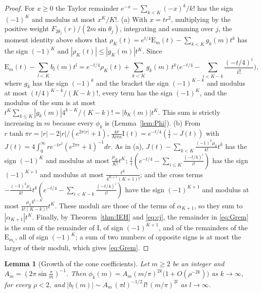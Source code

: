\documentclass[pdflatex,sn-mathphys-num]{sn-jnl}
\theoremstyle{thmstyleone}%
\newtheorem{lemma}[theorem]{Lemma}%
\theoremstyle{thmstylethree}%
\newcommand{\Area}{\operatorname{Area}}
\begin{document}
\begin{appendices}
\begin{proof}
For $x\ge0$ the Taylor remainder $e^{-x}-\sum_{k<K}(-x)^k/k!$ has the sign $(-1)^K$ and modulus at most $x^K/K!$. (a) With $x=tr^2$, multiplying by the positive weight $F_{2\theta_j}(r)/(2m\sin\theta_j)$, integrating and summing over $j$, the moment identity above shows that $\rho_K(t)=e^{t/4}\mathrm E_m(t)-\sum_{k<K}g_k(m)t^k$ has the sign $(-1)^K$ and $|\rho_K(t)|\le|g_K(m)|t^K$. Since
\[
  \mathrm E_m(t)-\sum_{l<K}b_l(m)t^l=e^{-t/4}\rho_K(t)+\sum_{k<K}g_k(m)\,t^k\Big(e^{-t/4}-\sum_{i<K-k}\frac{(-t/4)^i}{i!}\Big),
\]
where $g_k$ has the sign $(-1)^k$ and the bracket the sign $(-1)^{K-k}$ and modulus at most $(t/4)^{K-k}/(K-k)!$, every term has the sign $(-1)^K$, and the modulus of the sum is at most $t^K\sum_{k\le K}|g_k(m)|4^{k-K}/(K-k)!=|b_K(m)|t^K$. This sum is strictly increasing in $m$ because every $\phi_k$ is (Lemma~\ref{lem:Phi}). (b) From $r\tanh\pi r=|r|-2|r|/(e^{2\pi|r|}+1)$, $\frac{4\pi}{\Area}\mathrm I(t)=e^{-t/4}(\frac1t-J(t))$ with $J(t)=4\int_0^\infty re^{-tr^2}(e^{2\pi r}+1)^{-1}dr$. As in (a), $J(t)-\sum_{k<K}\frac{(-1)^k\mu_k}{k!}t^k$ has the sign $(-1)^K$ and modulus at most $\frac{\mu_K}{K!}t^K$; $\frac1t(e^{-t/4}-\sum_{i\le K}\frac{(-t/4)^i}{i!})$ has the sign $(-1)^{K+1}$ and modulus at most $\frac{t^K}{4^{K+1}(K+1)!}$; and the cross terms $-\frac{(-1)^k\mu_k}{k!}t^k(e^{-t/4}-\sum_{i<K-k}\frac{(-t/4)^i}{i!})$ have the sign $(-1)^{K+1}$ and modulus at most $\frac{\mu_k4^{k-K}}{k!(K-k)!}t^K$. These moduli are those of the terms of $\alpha_{K+1}$, so they sum to $|\alpha_{K+1}|t^K$. Finally, by Theorem~\ref{thm:IEH} and \eqref{eq:cj}, the remainder in \eqref{eq:Grem} is the sum of the remainder of $\mathrm I$, of sign $(-1)^{K+1}$, and of the remainders of the $\mathrm E_{m_i}$, all of sign $(-1)^K$; a sum of two numbers of opposite signs is at most the larger of their moduli, which gives \eqref{eq:Grem}.
\end{proof}

\begin{lemma}[Growth of the cone coefficients]\label{lem:growth}
Let $m\ge2$ be an integer and $A_m=(2\pi\sin\frac\pi m)^{-1}$. Then $\phi_k(m)=A_m(m/\pi)^{2k}\big(1+O(\rho^{-2k})\big)$ as $k\to\infty$, for every $\rho<2$, and $|b_l(m)|\sim A_m\,(\pi l)^{-1/2}\,l!\,(m/\pi)^{2l}$ as $l\to\infty$.
\end{lemma}


\end{appendices}
\end{document}
